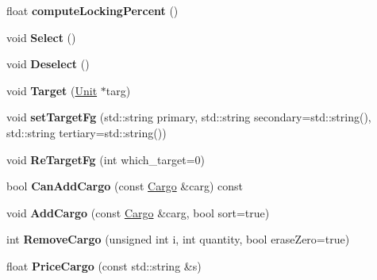 \begin{DoxyCompactItemize}
\item 
float {\bfseries compute\+Locking\+Percent} ()\hypertarget{classUnit_a1afdd820d7d0e0e9425e98fe9eff9c1c}{}\label{classUnit_a1afdd820d7d0e0e9425e98fe9eff9c1c}

\item 
void {\bfseries Select} ()\hypertarget{classUnit_adc2a2780e32799686a92c585e30511d5}{}\label{classUnit_adc2a2780e32799686a92c585e30511d5}

\item 
void {\bfseries Deselect} ()\hypertarget{classUnit_a99931142bd1a041df9d126b2cf5ec117}{}\label{classUnit_a99931142bd1a041df9d126b2cf5ec117}

\item 
void {\bfseries Target} (\hyperlink{classUnit}{Unit} $\ast$targ)\hypertarget{classUnit_a26227e9e343e338a52557bccfac1aa76}{}\label{classUnit_a26227e9e343e338a52557bccfac1aa76}

\item 
void {\bfseries set\+Target\+Fg} (std\+::string primary, std\+::string secondary=std\+::string(), std\+::string tertiary=std\+::string())\hypertarget{classUnit_a3322179da0140714fd2a74ad23eb88fb}{}\label{classUnit_a3322179da0140714fd2a74ad23eb88fb}

\item 
void {\bfseries Re\+Target\+Fg} (int which\+\_\+target=0)\hypertarget{classUnit_a702fc35310108e9e60dad93e3ca0849e}{}\label{classUnit_a702fc35310108e9e60dad93e3ca0849e}

\item 
bool {\bfseries Can\+Add\+Cargo} (const \hyperlink{classCargo}{Cargo} \&carg) const \hypertarget{classUnit_aaddc23b04acd39c45fd49b0285c57d6a}{}\label{classUnit_aaddc23b04acd39c45fd49b0285c57d6a}

\item 
void {\bfseries Add\+Cargo} (const \hyperlink{classCargo}{Cargo} \&carg, bool sort=true)\hypertarget{classUnit_a56180845d063c953c1154ed758b8233b}{}\label{classUnit_a56180845d063c953c1154ed758b8233b}

\item 
int {\bfseries Remove\+Cargo} (unsigned int i, int quantity, bool erase\+Zero=true)\hypertarget{classUnit_afe6412516303e099f50e455ab93d4038}{}\label{classUnit_afe6412516303e099f50e455ab93d4038}

\item 
float {\bfseries Price\+Cargo} (const std\+::string \&s)\hypertarget{classUnit_aada662ff7a48ef6e66f99d8c09dde9bd}{}\label{classUnit_aada662ff7a48ef6e66f99d8c09dde9bd}


\end{DoxyCompactItemize}
